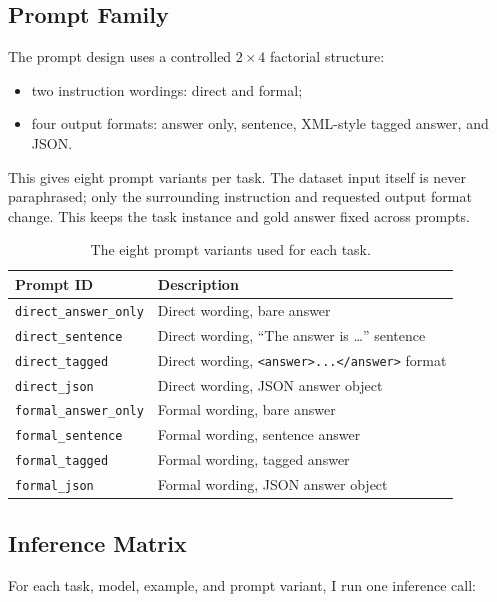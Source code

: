 \documentclass[11pt]{article}
\begin{document}
\subsection{Prompt Family}

The prompt design uses a controlled $2 \times 4$ factorial structure:

\begin{itemize}[leftmargin=*]
    \item two instruction wordings: direct and formal;
    \item four output formats: answer only, sentence, XML-style tagged answer, and JSON.
\end{itemize}

This gives eight prompt variants per task. The dataset input itself is never paraphrased; only the surrounding instruction and requested output format change. This keeps the task instance and gold answer fixed across prompts.

\begin{table}[h]
\centering
\begin{tabular}{ll}
\toprule
Prompt ID & Description \\
\midrule
\texttt{direct\_answer\_only} & Direct wording, bare answer \\
\texttt{direct\_sentence} & Direct wording, ``The answer is \dots'' sentence \\
\texttt{direct\_tagged} & Direct wording, \texttt{<answer>...</answer>} format \\
\texttt{direct\_json} & Direct wording, JSON answer object \\
\texttt{formal\_answer\_only} & Formal wording, bare answer \\
\texttt{formal\_sentence} & Formal wording, sentence answer \\
\texttt{formal\_tagged} & Formal wording, tagged answer \\
\texttt{formal\_json} & Formal wording, JSON answer object \\
\bottomrule
\end{tabular}
\caption{The eight prompt variants used for each task.}
\label{tab:prompts}
\end{table}

\subsection{Inference Matrix}

For each task, model, example, and prompt variant, I run one inference call:
\end{document}
